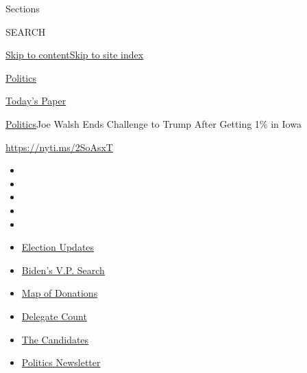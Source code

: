 Sections

SEARCH

\protect\hyperlink{site-content}{Skip to
content}\protect\hyperlink{site-index}{Skip to site index}

\href{https://www.nytimes.com/section/politics}{Politics}

\href{https://myaccount.nytimes.com/auth/login?response_type=cookie\&client_id=vi}{}

\href{https://www.nytimes.com/section/todayspaper}{Today's Paper}

\href{/section/politics}{Politics}\textbar{}Joe Walsh Ends Challenge to
Trump After Getting 1\% in Iowa

\url{https://nyti.ms/2SoAsxT}

\begin{itemize}
\item
\item
\item
\item
\item
\end{itemize}

\begin{itemize}
\item
  \href{https://www.nytimes.com/2020/07/31/us/elections/biden-vs-trump.html?action=click\&pgtype=Article\&state=default\&region=TOP_BANNER\&context=storylines_menu}{Election
  Updates}
\item
  \href{https://www.nytimes.com/article/biden-vice-president-2020.html?action=click\&pgtype=Article\&state=default\&region=TOP_BANNER\&context=storylines_menu}{Biden's
  V.P. Search}
\item
  \href{https://www.nytimes.com/interactive/2020/07/24/us/politics/trump-biden-campaign-donors.html?action=click\&pgtype=Article\&state=default\&region=TOP_BANNER\&context=storylines_menu}{Map
  of Donations}
\item
  \href{https://www.nytimes.com/interactive/2020/us/elections/delegate-count-primary-results.html?action=click\&pgtype=Article\&state=default\&region=TOP_BANNER\&context=storylines_menu}{Delegate
  Count}
\item
  \href{https://www.nytimes.com/interactive/2019/us/politics/2020-presidential-candidates.html?action=click\&pgtype=Article\&state=default\&region=TOP_BANNER\&context=storylines_menu}{The
  Candidates}
\item
  \href{https://www.nytimes.com/newsletters/politics?action=click\&pgtype=Article\&state=default\&region=TOP_BANNER\&context=storylines_menu}{Politics
  Newsletter}
\end{itemize}


